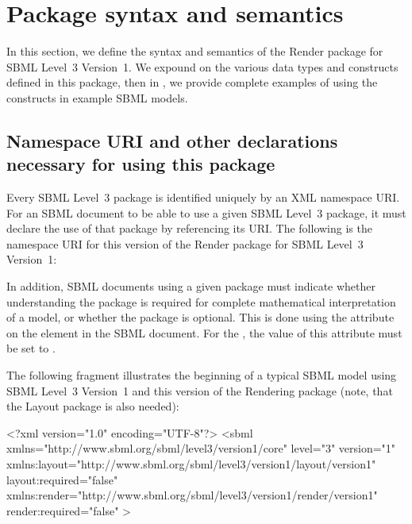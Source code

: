 
\section{Package syntax and semantics}
\label{syntax}

In this section, we define the syntax and semantics of the Render package for SBML Level~3 
Version~1.  We expound on the various
data types and constructs defined in this package, then in ,
we provide complete examples of using the constructs in example SBML
models.

\subsection{Namespace URI and other declarations necessary for using this
package}
\label{xml-namespace}

Every SBML Level~3 package is identified uniquely by an XML namespace URI.
For an SBML document to be able to use a given SBML Level~3 package, it
must declare the use of that package by referencing its URI.  The following
is the namespace URI for this version of the Render
package for SBML Level~3 Version~1:
\begin{center}
\end{center}

In addition, SBML documents using a given package must indicate whether understanding the package is required for complete mathematical interpretation of a model, or whether the package is optional.  This is done using the attribute  on the  element in the SBML document.  For the \RenderPackage, the value of this attribute must be set to .

The following fragment illustrates the beginning of a typical SBML model
using SBML Level~3 Version~1 and this version of the Rendering package (note, that the Layout package is also needed):

\begin{example}
<?xml version="1.0" encoding="UTF-8"?>
 <sbml xmlns="http://www.sbml.org/sbml/level3/version1/core" level="3" version="1"
   xmlns:layout="http://www.sbml.org/sbml/level3/version1/layout/version1" layout:required="false"
   xmlns:render="http://www.sbml.org/sbml/level3/version1/render/version1" render:required="false"
	>
	
\end{example}


